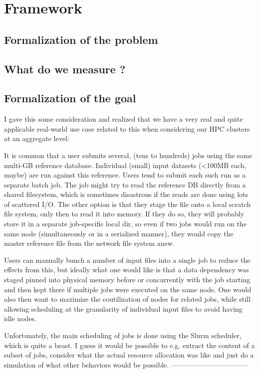 \documentclass[a4paper]{article}
\begin{document}
\tableofcontents
\listoffigures
\newpage

\section{Framework}

\subsection{Formalization of the problem}
\subsection{What do we measure ?}
\subsection{Formalization of the goal}

I gave this some consideration and realized that we have a very real and quite applicable real-world use case related to this when considering our HPC clusters at an aggregate level:

It is common that a user submits several, (tens to hundreds) jobs using the same multi-GB reference database.
Individual (small) input datasets (<100MB each, maybe) are run against this reference.
Users tend to submit each such run as a separate batch job.
The job might try to read the reference DB directly from a shared filesystem, which is sometimes disastrous if the reads are done using lots of scattered I/O.
The other option is that they stage the file onto a local scratch file system, only then to read it into memory.
If they do so, they will probably store it in a separate job-specific local dir, so even if two jobs would run on the same node (simultaneously or in a serialized manner), they would copy the master reference file from the network file system anew.

Users can manually bunch a number of input files into a single job to reduce the effects from this,
but ideally what one would like is that a data dependency was staged pinned into physical memory
before or concurrently with the job starting and then kept there if multiple jobs were executed on the same node.
One would also then want to maximize the coutilization of nodes for related jobs,
while still allowing scheduling at the granularity of individual input files to avoid having idle nodes.

Unfortunately, the main scheduling of jobs is done using the Slurm scheduler, which is quite a beast.
I guess it would be possible to e.g. extract the content of a subset of jobs, consider what the actual
resource allocation was like and just do a simulation of what other behaviors would be possible.
---------------------------------
\end{document}
